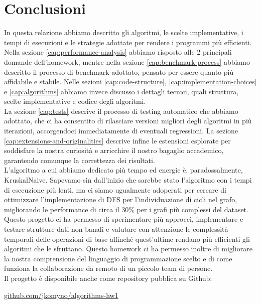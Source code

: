 \section{Conclusioni}
\label{cap:conclusions}

In questa relazione abbiamo descritto gli algoritmi, le scelte implementative, i tempi di esecuzioni e le strategie adottate per rendere i programmi più efficienti. \\

\noindent Nella sezione \ref{cap:performance-analysis} abbiamo risposto alle 2 principali domande dell'homework, mentre nella sezione \ref{cap:benchmark-process} abbiamo descritto il processo di benchmark adottato, pensato per essere quanto più affidabile e stabile.
Nelle sezioni \ref{cap:code-structure}, \ref{cap:implementation-choices} e \ref{cap:algorithms} abbiamo invece discusso i dettagli tecnici, quali struttura, scelte implementative e codice degli algoritmi. \\

\noindent  La sezione \ref{cap:tests} descrive il processo di testing automatico che abbiamo adottato, che ci ha consentito di rilasciare versioni migliori degli algoritmi in più iterazioni, accorgendoci immediatamente di eventuali regressioni. La sezione \ref{cap:extensions-and-originalities} descrive infine le estensioni esplorate per soddisfare la nostra curiosità e arricchire il nostro bagaglio accademico, garantendo comunque la correttezza dei risultati. \\

\noindent L'algoritmo a cui abbiamo dedicato più tempo ed energie è, paradossalmente, KruskalNaive. Sapevamo sin dall'inizio che sarebbe stato l'algoritmo con i tempi di esecuzione più lenti, ma ci siamo ugualmente adoperati per cercare di ottimizzare l'implementazione di DFS per l'individuazione di cicli nel grafo, migliorando le performance di circa il 30\% per i grafi più complessi del dataset.\\

\noindent Questo progetto ci ha permesso di sperimentare più approcci, implementare e testare strutture dati non banali e valutare con attenzione le complessità temporali delle operazioni di base affinché quest'ultime rendano più efficienti gli algoritmi che le sfruttano. Questo homework ci ha permesso inoltre di migliorare la nostra comprensione del linguaggio di programmazione scelto e di come funziona la collaborazione da remoto di un piccolo team di persone. \\

\noindent Il progetto è disponibile anche come repository pubblica su Github:

\begin{center}
\href{https://github.com/jkomyno/algorithms-hw1}{github.com/jkomyno/algorithms-hw1}
\end{center}
